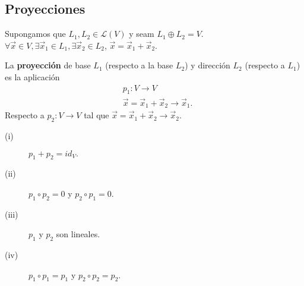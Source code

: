 \subsection{Proyecciones}
Supongamos que $\displaystyle L_{1}, L_{2} \in \mathcal{L} \left(V\right)$ y seam $\displaystyle L_{1} \oplus L_{2} = V $. $\displaystyle \forall \vec{x} \in V , \exists \vec{x}_{1} \in L_{1}, \exists\vec{x}_{2} \in L_{2}$, $\displaystyle \vec{x} = \vec{x}_{1}+\vec{x}_{2} $.
\begin{fdefinition}[Proyección]
\normalfont La \textbf{proyección} de base $\displaystyle L_{1} $ (respecto a la base $\displaystyle L_{2} $) y dirección $\displaystyle L_{2} $ (respecto a $\displaystyle L_{1} $) es la aplicación 
\[
\begin{split}
& p_{1} : V \to V \\
& \vec{x} = \vec{x}_{1}+\vec{x}_{2} \to \vec{x}_{1}.
\end{split}
\]
Respecto a $\displaystyle p_{2}: V \to V $ tal que $\displaystyle \vec{x} = \vec{x}_{1}+\vec{x}_{2} \to \vec{x}_{2}$.
\end{fdefinition}

\begin{ftheorem}[]
\normalfont 
\begin{description}
\item[(i)] $\displaystyle p_{1}+p_{2} = id _{V}. $  
\item[(ii)] $\displaystyle p_{1}\circ p_{2} = 0 $ y $\displaystyle p_{2} \circ p_{1} = 0 $.
\item[(iii)] $\displaystyle p_{1} $ y $\displaystyle p_{2} $ son lineales.
\item[(iv)] $\displaystyle p_{1} \circ p_{1} = p_{1} $ y $\displaystyle p_{2} \circ p_{2} = p_{2} $.
\end{description}
\end{ftheorem}

